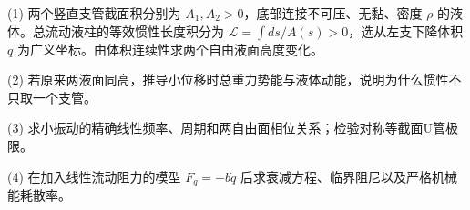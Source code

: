 (1) 两个竖直支管截面积分别为 \(A_1,A_2>0\)，底部连接不可压、无黏、密度 \(\rho\) 的液体。总流动液柱的等效惯性长度积分为 \(\mathcal L=\int ds/A(s)>0\)，选从左支下降体积 \(q\) 为广义坐标。由体积连续性求两个自由液面高度变化。

(2) 若原来两液面同高，推导小位移时总重力势能与液体动能，说明为什么惯性不只取一个支管。

(3) 求小振动的精确线性频率、周期和两自由面相位关系；检验对称等截面U管极限。

(4) 在加入线性流动阻力的模型 \(F_q=-b\dot q\) 后求衰减方程、临界阻尼以及严格机械能耗散率。
